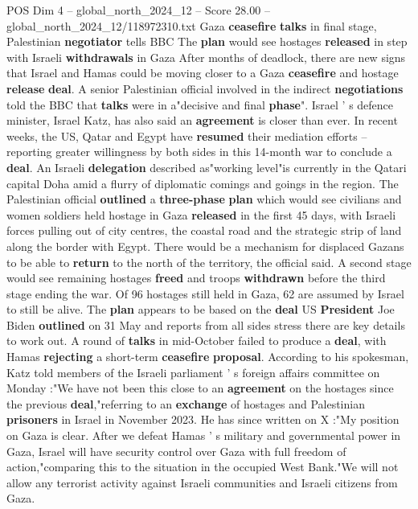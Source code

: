\begin{textsample}{POS Dim 4 – global\_north\_2024\_12 – Score 28.00 – global\_north\_2024\_12/118972310.txt}  \label{ex:f4_pos_303}
Gaza \textbf{ceasefire} \textbf{talks} in final stage, Palestinian \textbf{negotiator} tells BBC The \textbf{plan} would see hostages \textbf{released} in step with Israeli \textbf{withdrawals} in Gaza After months of deadlock, there are new signs that Israel and Hamas could be moving closer to a Gaza \textbf{ceasefire} and hostage \textbf{release} \textbf{deal}.
A senior Palestinian official involved in the indirect \textbf{negotiations} told the BBC that \textbf{talks} were in a"decisive and final \textbf{phase}".
Israel ' s defence minister, Israel Katz, has also said an \textbf{agreement} is closer than ever.
In recent weeks, the US, Qatar and Egypt have \textbf{resumed} their mediation efforts -- reporting greater willingness by both sides in this 14-month war to conclude a \textbf{deal}.
An Israeli \textbf{delegation} described as"working level"is currently in the Qatari capital Doha amid a flurry of diplomatic comings and goings in the region.
The Palestinian official \textbf{outlined} a \textbf{three-phase} \textbf{plan} which would see civilians and women soldiers held hostage in Gaza \textbf{released} in the first 45 days, with Israeli forces pulling out of city centres, the coastal road and the strategic strip of land along the border with Egypt.
There would be a mechanism for displaced Gazans to be able to \textbf{return} to the north of the territory, the official said.
A second stage would see remaining hostages \textbf{freed} and troops \textbf{withdrawn} before the third stage ending the war.
Of 96 hostages still held in Gaza, 62 are assumed by Israel to still be alive.
The \textbf{plan} appears to be based on the \textbf{deal} US \textbf{President} Joe Biden \textbf{outlined} on 31 May and reports from all sides stress there are key details to work out.
A round of \textbf{talks} in mid-October failed to produce a \textbf{deal}, with Hamas \textbf{rejecting} a short-term \textbf{ceasefire} \textbf{proposal}.
According to his spokesman, Katz told members of the Israeli parliament ' s foreign affairs committee on Monday :"We have not been this close to an \textbf{agreement} on the hostages since the previous \textbf{deal},"referring to an \textbf{exchange} of hostages and Palestinian \textbf{prisoners} in Israel in November 2023.
He has since written on X :"My position on Gaza is clear.
After we defeat Hamas ' s military and governmental power in Gaza, Israel will have security control over Gaza with full freedom of action,"comparing this to the situation in the occupied West Bank."We will not allow any terrorist activity against Israeli communities and Israeli citizens from Gaza.

\end{textsample}

